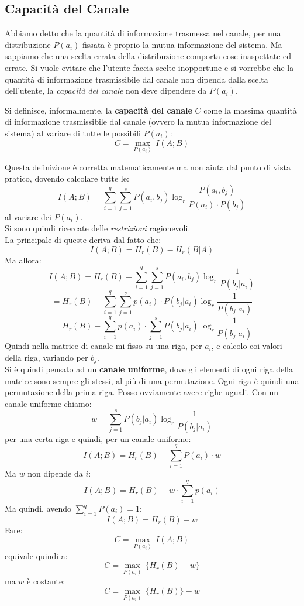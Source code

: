 \documentclass[a4paper,12pt, oneside]{book}
\begin{document}
\subsection{Capacità del Canale}
Abbiamo detto che la quantità di informazione trasmessa nel canale, per una
distribuzione $P(a_i)$ fissata è proprio la mutua informazione del sistema. Ma
sappiamo che una scelta errata della distribuzione comporta cose inaspettate ed
errate. Si vuole evitare che l'utente faccia scelte inopportune e si vorrebbe
che 
la quantità di informazione trasmissibile dal canale non dipenda dalla scelta
dell'utente, la \textit{capacità del canale} non deve dipendere da $P(a_i)$.
\begin{definizione}
  Si definisce, informalmente, la \textbf{capacità del canale} $C$ come la
  massima 
  quantità di informazione trasmissibile dal canale (ovvero la mutua
  informazione del sistema) al variare di tutte le
  possibili $P(a_i)$: 
  \[C=\max_{P(a_i)}\,I(A;B)\]
\end{definizione}
Questa definizione è corretta matematicamente ma non aiuta dal punto di vista
pratico, dovendo calcolare tutte le:
\[I(A;B)=\sum_{i=1}^q\sum_{j=1}^s P(a_i,b_j)\log_r\frac{P(a_i,b_j)}{P(a_i)\cdot
    P(b_j)}\]
al variare dei $P(a_i)$.\\
Si sono quindi ricercate delle \textit{restrizioni} ragionevoli.\\
La principale di queste deriva dal fatto che:
\[I(A;B)=H_r(B)-H_r(B|A)\]
Ma allora:
\[I(A;B)=H_r(B)-\sum_{i=1}^q\sum_{j=1}^s P(a_i,b_j)\log_r\frac{1}{P(b_j|a_i)}\]
\[=H_r(B)-\sum_{i=1}^q\sum_{j=1}^sp(a_i)\cdot
  P(b_j|a_i)\log_r\frac{1}{P(b_j|a_i)}\]
\[=H_r(B)-\sum_{i=1}^q p(a_i)\cdot\sum_{j=1}^s
  P(b_j|a_i)\log_r\frac{1}{P(b_j|a_i)}\]
Quindi nella matrice di canale mi fisso su una riga, per $a_i$, e calcolo coi
valori della riga, variando per $b_j$.\\
Si è quindi pensato ad un \textbf{canale uniforme}, dove gli elementi di ogni
riga della matrice sono sempre gli stessi, al più di una permutazione. Ogni riga
è quindi una permutazione della prima riga. Posso ovviamente avere righe uguali.
Con un canale uniforme chiamo:
\[w=\sum_{j=1}^sP(b_j|a_i)\log_r\frac{1}{P(b_j|a_i)}\]
per una certa riga e quindi, per un canale uniforme:
\[I(A;B)=H_r(B)-\sum_{i=1}^q P(a_i)\cdot w\]
Ma $w$ non dipende da $i$:
\[I(A;B)=H_r(B)-w\cdot \sum_{i=1}^q p(a_i)\]
Ma quindi, avendo $\sum_{i=1}^q P(a_i)=1$:
\[I(A;B)=H_r(B)-w\]
Fare:
\[C=\max_{P(a_i)}\,I(A;B)\]
equivale quindi a:
\[C=\max_{P(a_i)}\,\{H_r(B)-w\}\]
ma $w$ è costante:
\[C=\max_{P(a_i)}\,\{H_r(B)\}-w\]
\end{document}
